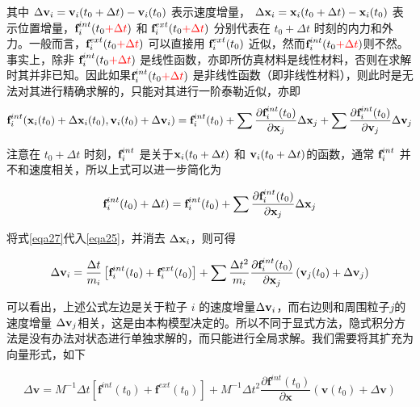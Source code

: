 其中 $\Delta \textbf{v}_i = \textbf{v}_i(t_0 + \Delta t) - \textbf{v}_i(t_0)$ 表示速度增量， $\Delta \textbf{x}_i = \textbf{x}_i(t_0 + \Delta t) - \textbf{x}_i(t_0)$ 表示位置增量，$\textbf{f}_i^{int}(t_0 \textcolor{red}{+ \Delta t})$ 和 $\textbf{f}_i^{ext}(t_0 \textcolor{red}{+ \Delta t})$ 分别代表在 $t_0 + \Delta t$ 时刻的内力和外力。一般而言，$\textbf{f}_i^{ext}(t_0 \textcolor{red}{+ \Delta t})$ 可以直接用 $\textbf{f}_i^{ext}(t_0)$ 近似，然而$\textbf{f}_i^{int}(t_0 \textcolor{red}{+ \Delta t})$则不然。事实上，除非 $\textbf{f}_i^{int}(t_0 \textcolor{red}{+ \Delta t})$ 是线性函数，亦即所仿真材料是线性材料，否则在求解时其并非已知。因此如果$\textbf{f}_i^{int}(t_0 \textcolor{red}{+ \Delta t})$ 是非线性函数（即非线性材料），则此时是无法对其进行精确求解的，只能对其进行一阶泰勒近似，亦即
\begin{equation}
\textbf{f}_i^{int}(\textbf{x}_i(t_0) + \Delta \textbf{x}_i(t_0),\textbf{v}_i(t_0)+\Delta \textbf{v}_i) = \textbf{f}_i^{int}(t_0) +
                                                         \sum\frac{\partial \textbf{f}_i^{int}(t_0)}{\partial \textbf{x}_j}\Delta \textbf{x}_j+
                                                         \sum\frac{\partial \textbf{f}_i^{int}(t_0)}{\partial \textbf{v}_j}\Delta \textbf{v}_j
\end{equation}

注意在 $t_0 + \Delta t$ 时刻，$\textbf{f}_i^{int}$ 是关于$\textbf{x}_i(t_0 + \Delta t)$ 和 $\textbf{v}_i(t_0 + \Delta t)$的函数，通常 $\textbf{f}_i^{int}$ 并不和速度相关，所以上式可以进一步简化为

\begin{equation}
\label{eqa27}
\textbf{f}_i^{int}(t_0)+ \Delta t) = \textbf{f}_i^{int}(t_0) +\sum\frac{\partial \textbf{f}_i^{int}(t_0)}{\partial \textbf{x}_j}\Delta \textbf{x}_j
\end{equation}

将式\ref{eqa27}代入\ref{eqa25}，并消去 $\Delta \textbf{x}_i$，则可得

\begin{equation}
\Delta \textbf{v}_i = \frac{\Delta t}{m_i}\left[\textbf{f}_i^{int}(t_0) + \textbf{f}_i^{ext}(t_0)\right]
           + \sum\frac{\Delta t^2}{m_i} \frac{\partial \textbf{f}_i^{int}(t_0)}{\partial \textbf{x}_j}
             \left(\textbf{v}_j(t_0) + \Delta \textbf{v}_j\right)
\end{equation}

可以看出，上述公式左边是关于粒子 $i$ 的速度增量$\Delta \textbf{v}_i$，而右边则和周围粒子$j$的速度增量 $\Delta \textbf{v}_j$相关，这是由本构模型决定的。所以不同于显式方法，隐式积分方法是没有办法对状态进行单独求解的，而只能进行全局求解。我们需要将其扩充为向量形式，如下

\begin{equation}
\Delta \textbf{v} = M^{-1}\Delta t\left[\textbf{f}^{int}(t_0) + \textbf{f}^{ext}(t_0)\right]
                  + M^{-1}\Delta t^2 \frac{\partial \textbf{f}^{int}(t_0)}{\partial \textbf{x}}
                    \left(\textbf{v}(t_0) + \Delta\textbf{v}\right)
\end{equation}


